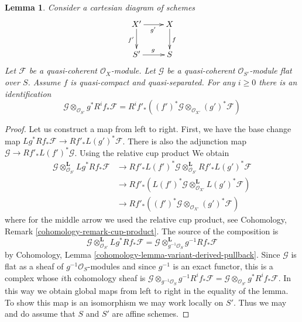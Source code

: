 \documentclass{stacks-project}
\theoremstyle{plain}
\newtheorem{lemma}[subsection]{Lemma}
\theoremstyle{definition}
\theoremstyle{remark}
\numberwithin{equation}{subsection}
\begin{document}
\begin{lemma}
\label{lemma-base-change-tensor-with-flat}
Consider a cartesian diagram of schemes
$$
\xymatrix{
X' \ar[d]_{f'} \ar[r]_{g'} & X \ar[d]^f \\
S' \ar[r]^g & S
}
$$
Let $\mathcal{F}$ be a quasi-coherent $\mathcal{O}_X$-module.
Let $\mathcal{G}$ be a quasi-coherent $\mathcal{O}_{S'}$-module
flat over $S$. Assume $f$ is quasi-compact and quasi-separated.
For any $i \geq 0$ there is an identification
$$
\mathcal{G} \otimes_{\mathcal{O}_{S'}} g^*R^if_*\mathcal{F} =
R^if'_*\left((f')^*\mathcal{G}
\otimes_{\mathcal{O}_{X'}} (g')^*\mathcal{F}\right)
$$
\end{lemma}

\begin{proof}
Let us construct a map from left to right. First, we have the base change map
$Lg^*Rf_*\mathcal{F} \to Rf'_*L(g')^*\mathcal{F}$. There is also the adjunction
map $\mathcal{G} \to Rf'_*L(f')^*\mathcal{G}$. Using the relative cup product
We obtain
\begin{align*}
\mathcal{G}
\otimes_{\mathcal{O}_{S'}}^\mathbf{L}
Lg^*Rf_*\mathcal{F}
& \to
Rf'_*L(f')^*\mathcal{G}
\otimes_{\mathcal{O}_{S'}}^\mathbf{L}
Rf'_*L(g')^*\mathcal{F} \\
& \to
Rf'_*\left(L(f')^*\mathcal{G}
\otimes_{\mathcal{O}_{X'}}^\mathbf{L}
L(g')^*\mathcal{F}\right) \\
& \to
Rf'_*\left((f')^*\mathcal{G}
\otimes_{\mathcal{O}_{X'}} (g')^*\mathcal{F}\right)
\end{align*}
where for the middle arrow we used the relative cup product, see
Cohomology, Remark \ref{cohomology-remark-cup-product}.
The source of the composition is
$$
\mathcal{G} \otimes_{\mathcal{O}_{S'}}^\mathbf{L} Lg^*Rf_*\mathcal{F} =
\mathcal{G} \otimes_{g^{-1}\mathcal{O}_S}^\mathbf{L} g^{-1}Rf_*\mathcal{F}
$$
by Cohomology, Lemma \ref{cohomology-lemma-variant-derived-pullback}.
Since $\mathcal{G}$ is flat as a sheaf of $g^{-1}\mathcal{O}_S$-modules
and since $g^{-1}$ is an exact functor, this is a complex whose
$i$th cohomology sheaf is
$\mathcal{G} \otimes_{g^{-1}\mathcal{O}_S} g^{-1}R^if_*\mathcal{F} =
\mathcal{G} \otimes_{\mathcal{O}_{S'}} g^*R^if_*\mathcal{F}$.
In this way we obtain global maps from left to right in the
equality of the lemma. To show this map is an isomorphism we may
work locally on $S'$. Thus we may and do assume that $S$ and $S'$
are affine schemes.


\end{proof}
\end{document}
